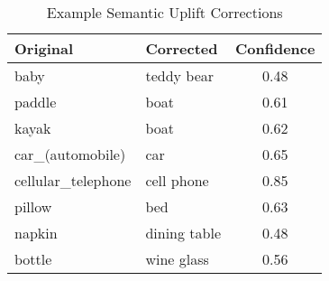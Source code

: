 \begin{table}[t]
\centering
\caption{Example Semantic Uplift Corrections}
\label{tab:corrections}
\small
\begin{tabular}{llc}
\toprule
\textbf{Original} & \textbf{Corrected} & \textbf{Confidence} \\
\midrule
baby & teddy bear & 0.48 \\
paddle & boat & 0.61 \\
kayak & boat & 0.62 \\
car\_(automobile) & car & 0.65 \\
cellular\_telephone & cell phone & 0.85 \\
pillow & bed & 0.63 \\
napkin & dining table & 0.48 \\
bottle & wine glass & 0.56 \\
\bottomrule
\end{tabular}
\end{table}
